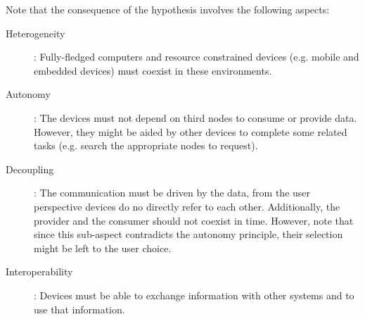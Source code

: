 Note that the consequence of the hypothesis involves the following aspects:
\begin{description}
  \item[Heterogeneity]: Fully-fledged computers and resource constrained devices (e.g. mobile and embedded devices) must coexist in these environments.
  \item[Autonomy]: The devices must not depend on third nodes to consume or provide data.
                   However, they might be aided by other devices to complete some related tasks (e.g. search the appropriate nodes to request).
  \item[Decoupling]: The communication must be driven by the data, from the user perspective devices do no directly refer to each other.
		    Additionally, the provider and the consumer should not coexist in time.
		    However, note that since this sub-aspect contradicts the autonomy principle, their selection might be left to the user choice.
  \item[Interoperability]: Devices must be able to exchange information with other systems and to use that information. %
\end{description}